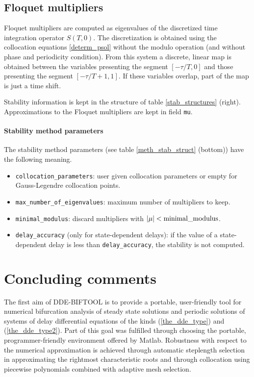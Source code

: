 \documentclass[10pt]{scrartcl}
\newcommand{\DDEBIFCODE}{\textsc{DDE-BIFTOOL}}
\newcommand{\blist}[1]{\mbox{\lstinline!#1!}}
\begin{document}
{\subsection{Floquet multipliers}
Floquet multipliers are computed as eigenvalues of the discretized
time integration operator $S(T,0)$.  The discretization is obtained
using the collocation equations \eqref{determ_psol} without the modulo
operation (and without phase and periodicity condition).  From this
system a discrete, linear map is obtained between the variables
presenting the segment $[-\tau/T,0]$ and those presenting the segment
$[-\tau/T+1,1]$.  If these variables overlap, part of the map is just
a time shift.

Stability information is kept in the structure of table
\ref{stab_structures} (right). Approximations to the Floquet
multipliers are kept in field \blist{mu}.
\paragraph{Stability method parameters}
The stability method parameters (see table \ref{meth_stab_struct}
(bottom)) have the following meaning.
\begin{itemize}
\item \blist{collocation_parameters}: user given collocation
  parameters or empty for Gauss-Legendre collocation points.
\item \blist{max_number_of_eigenvalues}: maximum number of multipliers
  to keep.
\item \blist{minimal_modulus}: discard multipliers with
$|\mu|<\blist{minimal_modulus}$.
\item \blist{delay_accuracy} (only for state-dependent delays): if the
  value of a state-dependent delay is less than
  \blist{delay_accuracy}, the stability is not computed.
\end{itemize}

\section{Concluding comments}\label{limits_sec}

The first aim of {\DDEBIFCODE} is to provide a portable,
user-friendly 
tool for numerical bifurcation analysis 
of steady state solutions and periodic solutions of systems
of delay differential equations of the kinds (\ref{the_dde_type})
and (\ref{the_dde_type2}).
Part of this goal was fulfilled through choosing
the portable, programmer-friendly environment
offered by Matlab.
Robustness with respect to the numerical approximation
is achieved through automatic steplength
selection in approximating the rightmost characteristic roots
and through collocation using piecewise polynomials combined
with adaptive mesh selection.

}
\end{document}
